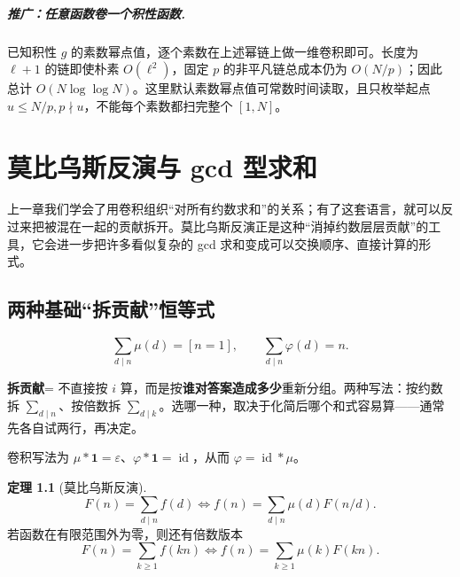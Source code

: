 \documentclass[UTF8,a4paper,11pt,twoside,openright,fontset=fandol]{ctexbook}
\theoremstyle{definition}
\newtheorem{theorem}[definition]{定理}
\newcommand{\eps}{\varepsilon}
\newcommand{\one}{\mathbf 1}
\newcommand{\id}{\operatorname{id}}
\begin{document}
\paragraph{推广：任意函数卷一个积性函数.}
已知积性 $g$ 的素数幂点值，逐个素数在上述幂链上做一维卷积即可。长度为 $\ell+1$ 的链即使朴素 $O(\ell^2)$，固定 $p$ 的非平凡链总成本仍为 $O(N/p)$；因此总计 $O(N\log\log N)$。这里默认素数幂点值可常数时间读取，且只枚举起点 $u\le N/p,p\nmid u$，不能每个素数都扫完整个 $[1,N]$。



\chapter{莫比乌斯反演与 gcd 型求和}
\begin{chapterintro}[章节导读]
上一章我们学会了用卷积组织“对所有约数求和”的关系；有了这套语言，就可以反过来把被混在一起的贡献拆开。莫比乌斯反演正是这种“消掉约数层层贡献”的工具，它会进一步把许多看似复杂的 gcd 求和变成可以交换顺序、直接计算的形式。
\end{chapterintro}

\section{两种基础“拆贡献”恒等式}
\[
\sum_{d\mid n}\mu(d)=[n=1],\qquad
\sum_{d\mid n}\varphi(d)=n.
\]

\begin{tip}[词义：拆贡献]
\textbf{拆贡献}= 不直接按 $i$ 算，而是按\textbf{谁对答案造成多少}重新分组。两种写法：按约数拆 $\sum_{d\mid n}$、按倍数拆 $\sum_{d\mid k}$。选哪一种，取决于化简后哪个和式容易算——通常先各自试两行，再决定。
\end{tip}

卷积写法为 $\mu*\one=\eps$、$\varphi*\one=\id$，从而 $\varphi=\id*\mu$。
\begin{theorem}[莫比乌斯反演]
\[
 F(n)=\sum_{d\mid n}f(d)
 \iff f(n)=\sum_{d\mid n}\mu(d)F(n/d).
\]
若函数在有限范围外为零，则还有倍数版本
\[
 F(n)=\sum_{k\ge1}f(kn)
 \iff f(n)=\sum_{k\ge1}\mu(k)F(kn).
\]
\end{theorem}
\end{document}
